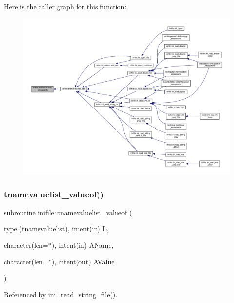 Here is the caller graph for this function\+:
\nopagebreak
\begin{figure}[H]
\begin{center}
\leavevmode
\includegraphics[width=350pt]{namespaceinifile_a761b93f34948645a73d7311a0dd5f833_icgraph}
\end{center}
\end{figure}
\mbox{\label{namespaceinifile_a7381759693093e431b8e0aabf6e4b0f2}} 
\subsubsection{\texorpdfstring{tnamevaluelist\+\_\+valueof()}{tnamevaluelist\_valueof()}}
{\footnotesize\ttfamily subroutine inifile\+::tnamevaluelist\+\_\+valueof (\begin{DoxyParamCaption}\item[{type (\mbox{\hyperlink{structinifile_1_1tnamevaluelist}{tnamevaluelist}}), intent(in)}]{L,  }\item[{character(len=$\ast$), intent(in)}]{A\+Name,  }\item[{character(len=$\ast$), intent(out)}]{A\+Value }\end{DoxyParamCaption})}



Referenced by ini\+\_\+read\+\_\+string\+\_\+file().

